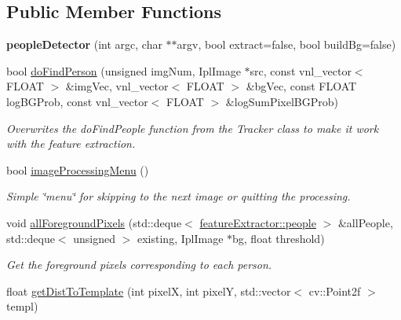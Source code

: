 \subsection*{Public Member Functions}
\begin{DoxyCompactItemize}
\item 
\hypertarget{classpeopleDetector_ab324175e53f9d1b43e383f6116a0360e}{
{\bfseries peopleDetector} (int argc, char $\ast$$\ast$argv, bool extract=false, bool buildBg=false)}
\label{classpeopleDetector_ab324175e53f9d1b43e383f6116a0360e}

\item 
\hypertarget{classpeopleDetector_aff38a72b47c051775f82b1567f2388af}{
bool \hyperlink{classpeopleDetector_aff38a72b47c051775f82b1567f2388af}{doFindPerson} (unsigned imgNum, IplImage $\ast$src, const vnl\_\-vector$<$ FLOAT $>$ \&imgVec, vnl\_\-vector$<$ FLOAT $>$ \&bgVec, const FLOAT logBGProb, const vnl\_\-vector$<$ FLOAT $>$ \&logSumPixelBGProb)}
\label{classpeopleDetector_aff38a72b47c051775f82b1567f2388af}

\begin{DoxyCompactList}\small\item\em Overwrites the {\ttfamily doFindPeople} function from the {\ttfamily Tracker} class to make it work with the feature extraction. \item\end{DoxyCompactList}\item 
\hypertarget{classpeopleDetector_a6f2d6a5438138b4a55e49f593bdad57c}{
bool \hyperlink{classpeopleDetector_a6f2d6a5438138b4a55e49f593bdad57c}{imageProcessingMenu} ()}
\label{classpeopleDetector_a6f2d6a5438138b4a55e49f593bdad57c}

\begin{DoxyCompactList}\small\item\em Simple \char`\"{}menu\char`\"{} for skipping to the next image or quitting the processing. \item\end{DoxyCompactList}\item 
\hypertarget{classpeopleDetector_a252be597382b70075093ad12362fe55e}{
void \hyperlink{classpeopleDetector_a252be597382b70075093ad12362fe55e}{allForegroundPixels} (std::deque$<$ \hyperlink{structfeatureExtractor_1_1people}{featureExtractor::people} $>$ \&allPeople, std::deque$<$ unsigned $>$ existing, IplImage $\ast$bg, float threshold)}
\label{classpeopleDetector_a252be597382b70075093ad12362fe55e}

\begin{DoxyCompactList}\small\item\em Get the foreground pixels corresponding to each person. \item\end{DoxyCompactList}\item 
\hypertarget{classpeopleDetector_a8fd96590d66992bac2ba74793b7d6aea}{
float \hyperlink{classpeopleDetector_a8fd96590d66992bac2ba74793b7d6aea}{getDistToTemplate} (int pixelX, int pixelY, std::vector$<$ cv::Point2f $>$ templ)}
\label{classpeopleDetector_a8fd96590d66992bac2ba74793b7d6aea}


\end{DoxyCompactItemize}
